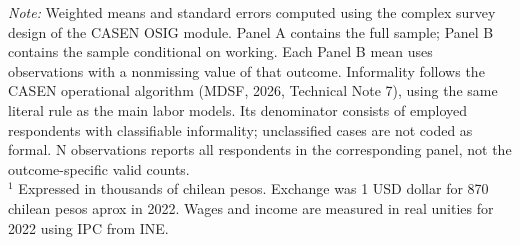 \begin{table}[htbp]
\vspace{1ex}
\raggedright
\footnotesize\textit{Note:} Weighted means and standard errors computed using the complex survey design of the CASEN OSIG module. Panel A contains the full sample; Panel B contains the sample conditional on working. Each Panel B mean uses observations with a nonmissing value of that outcome. Informality follows the CASEN operational algorithm (MDSF, 2026, Technical Note 7), using the same literal rule as the main labor models. Its denominator consists of employed respondents with classifiable informality; unclassified cases are not coded as formal. N observations reports all respondents in the corresponding panel, not the outcome-specific valid counts. \\
$^1$ Expressed in thousands of chilean pesos. Exchange was 1 USD dollar for 870 chilean pesos aprox in 2022. Wages and income are measured in real unities for 2022 using IPC from INE.
\end{table}
